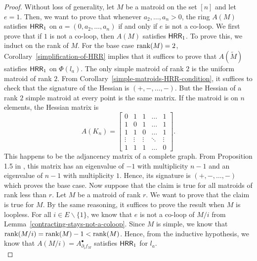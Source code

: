 \documentclass{puthesis-UG}
\begin{document}
\begin{proof}
	Without loss of generality, let $M$ be a matroid on the set $[n]$ and let $e = 1$. Then, we want to prove that whenever $a_2, \ldots, a_n > 0$, the ring $A(M)$ satisfies $\mathsf{HRR}_1$ on $a = (0, a_2, \ldots, a_n)$ if and only if $e$ is not a co-loop. We first prove that if $1$ is not a co-loop, then $A(M)$ satisfies $\mathsf{HRR}_1$. To prove this, we induct on the rank of $M$. For the base case $\operatorname{rank} (M) = 2$, Corollary~\ref{simplification-of-HRR} implies that it suffices to prove that $A(\widetilde{M})$ satisfies $\mathsf{HRR}_1$ on $\Phi(l_a)$. The only simple matroid of rank $2$ is the uniform matroid of rank $2$. From Corollary~\ref{simple-matroids-HRR-condition}, it suffices to check that the signature of the Hessian is $(+, -, \ldots, -)$. But the Hessian of a rank $2$ simple matroid at every point is the same matrix. If the matroid is on $n$ elements, the Hessian matrix is 
	\[
		A(K_n) = \begin{bmatrix} 
			0 & 1 & 1 & \ldots & 1 \\
			1 & 0 & 1 & \ldots & 1 \\
			1 & 1 & 0 & \ldots & 1 \\
			\vdots & \vdots & \vdots & \ddots & \vdots \\
			1 & 1 & 1 & \ldots & 0
		\end{bmatrix}.
	\]
	This happens to be the adjancency matrix of a complete graph. From Proposition 1.5 in \cite{Stanley-alg-combo}, this matrix has an eigenvalue of $-1$ with multiplicity $n-1$ and an eigenvalue of $n-1$ with multiplicity $1$. Hence, its signature is $(+, -, \ldots, -)$ which proves the base case. Now suppose that the claim is true for all matroids of rank less than $r$. Let $M$ be a matroid of rank $r$. We want to prove that the claim is true for $M$. By the same reasoning, it suffices to prove the result when $M$ is loopless. For all $i \in E \backslash \{1\}$, we know that $e$ is not a co-loop of $M / i$ from Lemma~\ref{contracting-stays-not-a-coloop}. Since $M$ is simple, we know that $\operatorname{rank} (M / i) = \operatorname{rank} (M) - 1 < \operatorname{rank} (M)$. Hence, from the inductive hypothesis, we know that $A(M/i) = A_{\partial_i f_M}^\bullet$ satisfies $\mathsf{HRR}_1$ for $l_a$. \\


\end{proof}
\end{document}
